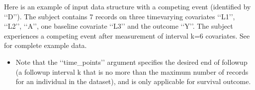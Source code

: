 \documentclass[letterpaper,10pt,english]{sphinxmanual}
\begin{document}
\sphinxAtStartPar
Here is an example of input data structure with a competing event (identified by ‘‘D’’). The subject contains 7 records on
three time\sphinxhyphen{}varying covariates ‘‘L1’’, ‘‘L2’’, ‘‘A’’, one baseline covariate ‘‘L3’’ and the outcome ‘‘Y’’.
The subject experiences a competing event after measurement of interval k=6 covariates. See  for complete example data.
\begin{quote}

\end{quote}
\begin{itemize}
\item {} 
\sphinxAtStartPar
Note that the ‘‘time\_points’’ argument specifies the desired end of follow\sphinxhyphen{}up (a
follow\sphinxhyphen{}up interval k that is no more than the maximum number of records for an individual in the dataset),
and is only applicable for survival outcome.

\end{itemize}
\end{document}
